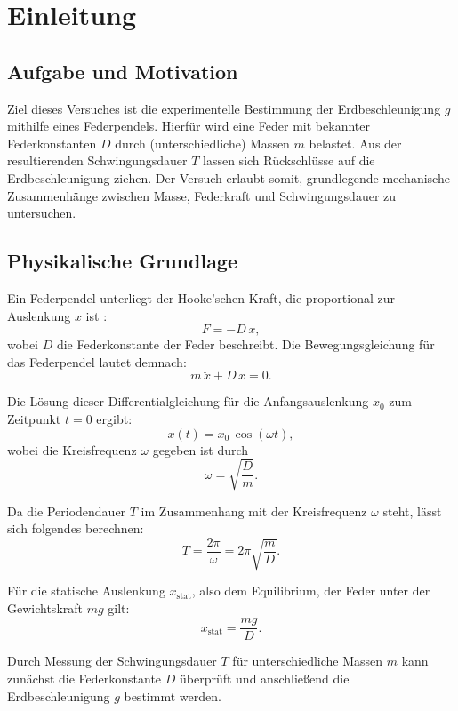 \chapter{Einleitung}

\section{Aufgabe und Motivation}
Ziel dieses Versuches ist die experimentelle Bestimmung der Erdbeschleunigung $g$ mithilfe eines Federpendels. Hierfür wird eine Feder mit bekannter Federkonstanten $D$ durch (unterschiedliche) Massen $m$ belastet. Aus der resultierenden Schwingungsdauer $T$ lassen sich Rückschlüsse auf die Erdbeschleunigung ziehen. Der Versuch erlaubt somit, grundlegende mechanische Zusammenhänge zwischen Masse, Federkraft und Schwingungsdauer zu untersuchen.

\section{Physikalische Grundlage}
Ein Federpendel unterliegt der Hooke'schen Kraft, die proportional zur Auslenkung $x$ ist \cite{skript25,demtroeder17}:
\begin{equation}
    F = -D \, x,
\end{equation}
wobei $D$ die Federkonstante der Feder beschreibt. Die Bewegungsgleichung für das Federpendel lautet demnach:
\begin{equation}
    m \, \ddot{x} + D \, x = 0.
\end{equation}

Die Lösung dieser Differentialgleichung für die Anfangsauslenkung $x_0$ zum Zeitpunkt $t = 0$ ergibt:
\begin{equation}
    x(t) = x_0 \, \cos(\omega t),
\end{equation}
wobei die Kreisfrequenz $\omega$ gegeben ist durch
\begin{equation}
    \omega = \sqrt{\frac{D}{m}}.
\end{equation}

Da die Periodendauer $T$ im Zusammenhang mit der Kreisfrequenz $\omega$ steht, lässt sich folgendes berechnen:
\begin{equation}
    T = \frac{2 \pi}{\omega} = 2 \pi \sqrt{\frac{m}{D}}.
\end{equation}

Für die statische Auslenkung $x_\text{stat}$, also dem Equilibrium, der Feder unter der Gewichtskraft $mg$ gilt:
\begin{equation}
    x_\text{stat} = \frac{mg}{D}.
\end{equation}

Durch Messung der Schwingungsdauer $T$ für unterschiedliche Massen $m$ kann zunächst die Federkonstante $D$ überprüft und anschließend die Erdbeschleunigung $g$ bestimmt werden. 